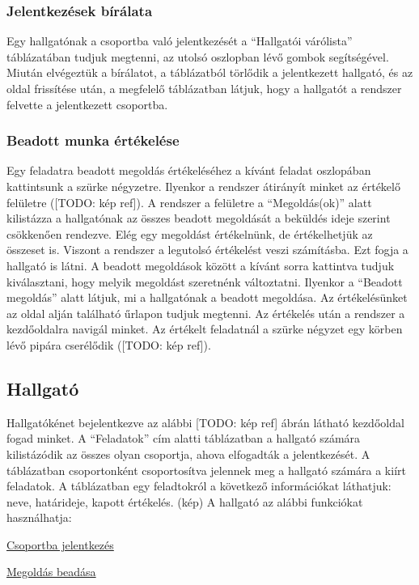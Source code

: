\subsubsection{Jelentkezések bírálata}
\label{step:instructor-pending}
Egy hallgatónak a csoportba való jelentkezését a ``Hallgatói várólista'' táblázatában tudjuk megtenni, az utolsó oszlopban lévő gombok segítségével. Miután elvégeztük a bírálatot, a táblázatból törlődik a jelentkezett hallgató, és az oldal frissítése után, a megfelelő táblázatban látjuk, hogy a hallgatót a rendszer felvette a jelentkezett csoportba.
\subsubsection{Beadott munka értékelése}
\label{step:instructor-eval}
Egy feladatra beadott megoldás értékeléséhez a kívánt feladat oszlopában kattintsunk a szürke négyzetre. Ilyenkor a rendszer átirányít minket az értékelő felületre ([TODO: kép ref]). A rendszer a felületre a ``Megoldás(ok)'' alatt kilistázza a hallgatónak az összes beadott megoldását a beküldés ideje szerint csökkenően rendezve. Elég egy megoldást értékelnünk, de értékelhetjük az összeset is. Viszont a rendszer a legutolsó értékelést veszi számításba. Ezt fogja a hallgató is látni. A beadott megoldások között a kívánt sorra kattintva tudjuk kiválasztani, hogy melyik megoldást szeretnénk változtatni. Ilyenkor a ``Beadott megoldás'' alatt látjuk, mi a hallgatónak a beadott megoldása. Az értékelésünket az oldal alján található űrlapon tudjuk megtenni. Az értékelés után a rendszer a kezdőoldalra navigál minket. Az értékelt feladatnál a szürke négyzet egy körben lévő pipára cserélődik ([TODO: kép ref]).
\subsection{Hallgató}
\label{step:student-role}
Hallgatókénet bejelentkezve az alábbi [TODO: kép ref] ábrán látható kezdőoldal fogad minket. A ``Feladatok'' cím alatti táblázatban a hallgató számára kilistázódik az összes olyan csoportja, ahova elfogadták a jelentkezését. A táblázatban csoportonként csoportosítva jelennek meg a hallgató számára a kiírt feladatok. A táblázatban egy feladtokról a következő információkat láthatjuk: neve, határideje, kapott értékelés. (kép)
A hallgató az alábbi funkciókat használhatja:
\begin{compactitem}
    \item \hyperref[step:student-course-reg]{Csoportba jelentkezés}
	\item \hyperref[step:student-solution]{Megoldás beadása}
\end{compactitem}
